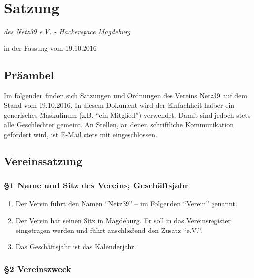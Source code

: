 \documentclass[german]{article}
\begin{document}
\section*{Satzung}\label{satzung}

\emph{des Netz39 e.V. - Hackerspace Magdeburg}

in der Fassung vom 19.10.2016

\subsection*{Präambel}\label{pruxe4ambel}

Im folgenden finden sich Satzungen und Ordnungen des Vereins Netz39 auf
dem Stand vom 19.10.2016. In diesem Dokument wird der Einfachheit halber
ein generisches Maskulinum (z.B. ``ein Mitglied'') verwendet. Damit sind
jedoch stets alle Geschlechter gemeint. An Stellen, an denen
schriftliche Kommunikation gefordert wird, ist E-Mail stets mit
eingeschlossen.

\subsection*{Vereinssatzung}\label{vereinssatzung}

\subsubsection*{§1 Name und Sitz des Vereins;
Geschäftsjahr}\label{name-und-sitz-des-vereins-geschuxe4ftsjahr}

\begin{enumerate}
\def\labelenumi{\arabic{enumi}.}
\item
  Der Verein führt den Namen ``Netz39'' -- im Folgenden ``Verein''
  genannt.
\item
  Der Verein hat seinen Sitz in Magdeburg. Er soll in das
  Vereinsregister eingetragen werden und führt anschließend den Zusatz
  ``e.V.''.
\item
  Das Geschäftsjahr ist das Kalenderjahr.
\end{enumerate}

\subsubsection*{§2 Vereinszweck}\label{vereinszweck}
\end{document}
